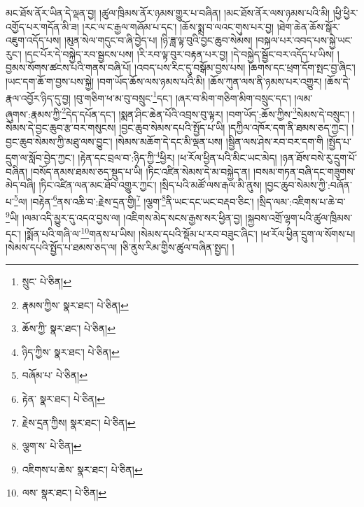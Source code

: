 མང་ཐོས་ནོར་ཡིན་དེ་ལྡན་བྱ། །ཚུལ་ཁྲིམས་ནོར་ཉམས་གྱུར་པ་བཞིན། །མང་ཐོས་ནོར་ལས་ཉམས་པའི་མི། །ཕྱི་ཕྱིར་འགྱོད་པར་གདོན་མི་ཟ། །རང་ལ་ང་རྒྱལ་གཞོམ་པ་དང་། །ཆོས་སྨྲ་བ་ལའང་གུས་པར་བྱ། །ཐེག་ཆེན་ཆོས་སྒོར་འཇུག་འདོད་པས། །མུན་སེལ་གདུང་བ་ཞི་བྱེད་པ། །ཉི་ཟླ་ལྟ་བུའི་བྱང་ཆུབ་སེམས། །བསྐལ་པར་འབད་པས་སྐྱེ་ཡང་རུང་། །དང་པོར་དེ་བསྐྱེད་རབ་སྦྱངས་པས། །རི་རབ་ལྟ་བུར་བརྟན་པར་བྱ། །དེ་བསྐྱེད་སྦྱོང་བར་འདོད་པ་ཡིས། །བྱམས་སོགས་ཚངས་པའི་གནས་བཞི་པོ། །འབད་པས་རིང་དུ་བསྒོམ་བྱས་པས། །ཆགས་དང་ཕྲག་དོག་སྤང་བྱ་ཞིང་། །ཡང་དག་ཆོ་ག་བྱས་པས་སྐྱེ། །བག་ཡོད་ཆོས་ལས་ཉམས་པའི་མི། །ཆོས་ཀུན་ལས་ནི་ཉམས་པར་འགྱུར། །ཆོས་དེ་རྣལ་འབྱོར་ཉིད་དུ་བྱ། །བུ་གཅིག་ཕ་མ་བུ་བསྲུང་\footnote{སྲུང་  པེ་ཅིན། }དང་། །ཞར་བ་མིག་གཅིག་མིག་བསྲུང་དང་། །ལམ་ཞུགས་:རྣམས་ཀྱི་\footnote{རྣམས་ཀྱིས་  སྣར་ཐང་།  པེ་ཅིན། }དེད་དཔོན་དང་། །སྨན་ཤིང་ཆེན་པོའི་འབྲས་བུ་ལྟར། །བག་ཡོད་:ཆོས་ཀྱིས་\footnote{ཆོས་ཀྱི་  སྣར་ཐང་།  པེ་ཅིན། }སེམས་དེ་བསྲུང་། །སེམས་དེ་བྱང་ཆུབ་རྩ་བར་གསུངས། །བྱང་ཆུབ་སེམས་དཔའི་སྤྱོད་པ་ཡི། །དཀྱིལ་འཁོར་དག་ནི་ཐམས་ཅད་ཀྱང་། །བྱང་ཆུབ་སེམས་ཀྱི་མཐུ་ལས་བྱུང་། །སེམས་མཆོག་དེ་དང་མི་ལྡན་པས། །སྦྱིན་ལས་ཤེས་རབ་བར་དག་གི །སྤྱོད་པ་དྲུག་ལ་སློབ་བྱེད་ཀྱང་། །རྟེན་དང་བྲལ་བ་:ཉིད་ཀྱི་\footnote{ཉིད་ཀྱིས་  སྣར་ཐང་།  པེ་ཅིན། }ཕྱིར། །ཕ་རོལ་ཕྱིན་པའི་མིང་ཡང་མེད། །ཉན་ཐོས་བསེ་རུ་དྲུག་པོ་བཞིན། །བསོད་ནམས་ཐམས་ཅད་སྡུད་པ་ཡི། །ཏིང་འཛིན་སེམས་དེ་མ་བསྐྱེད་ན། །བསམ་གཏན་བཞི་དང་གཟུགས་མེད་བཞི། །ཏིང་འཛིན་ལན་མང་ཐོབ་འགྱུར་ཀྱང་། །སྲིད་པའི་མཚོ་ལས་རྒལ་མི་ནུས། །བྱང་ཆུབ་སེམས་ཀྱི་:བཞོན་པ་\footnote{བཞོམ་པ་  པེ་ཅིན། }ལ། །བརྟེན་\footnote{རྟེན་  སྣར་ཐང་།  པེ་ཅིན། }ནས་འཆི་བ་:རྗེས་དྲན་གྱི།\footnote{རྗེས་དྲན་ཀྱིས།  སྣར་ཐང་།  པེ་ཅིན། } །ལྕག་\footnote{ལྕག་ས་  པེ་ཅིན། }ནི་ཡང་དང་ཡང་བརྡབ་ཅིང་། །སྲིད་ལམ་:འཇིགས་པ་ཆེ་བ་\footnote{འཇིགས་པ་ཆེས་  སྣར་ཐང་།  པེ་ཅིན། }ཡི། །ལམ་འདི་མྱུར་དུ་འདའ་བྱས་ལ། །འཇིགས་མེད་སངས་རྒྱས་སར་ཕྱིན་བྱ། །སྐྱབས་འགྲོ་ལྷག་པའི་ཚུལ་ཁྲིམས་དང་། །སྨོན་པའི་གཞི་ལ་\footnote{ལས་  སྣར་ཐང་།  པེ་ཅིན། }གནས་པ་ཡིས། །སེམས་དཔའི་སྡོམ་པ་རབ་བཟུང་ཞིང་། །ཕ་རོལ་ཕྱིན་དྲུག་ལ་སོགས་པ། །སེམས་དཔའི་སྤྱོད་པ་ཐམས་ཅད་ལ། །ཅི་ནུས་རིམ་གྱིས་ཚུལ་བཞིན་སྤྱད། །
